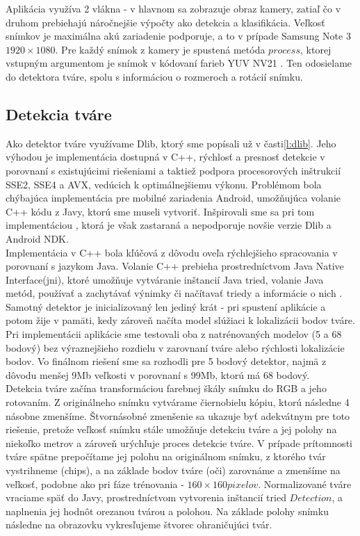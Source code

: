 \indent Aplikácia využíva 2 vlákna - v hlavnom sa zobrazuje obraz kamery, zatiaľ čo v druhom prebiehajú náročnejšie výpočty ako detekcia a klasifikácia.
Veľkosť snímkov je maximálna akú zariadenie podporuje, a to v prípade Samsung Note 3 $ 1920 \times 1080  $.
Pre každý snímok z kamery je spustená metóda $ process $, ktorej vstupným argumentom je snímok v kódovaní farieb YUV NV21 \cite{YUVWikip53}.
Ten odosielame do detektora tváre, spolu s informáciou o rozmeroch a rotácií snímku.

\subsection{Detekcia tváre}
Ako detektor tváre využívame Dlib, ktorý sme popísali už v časti\ref{l:dlib}.
Jeho výhodou je implementácia dostupná v C++, rýchlosť a presnosť detekcie v porovnaní s existujúcimi riešeniami a taktiež podpora procesorových inštrukcií SSE2, SSE4 a AVX, vedúcich k optimálnejšiemu výkonu.
Problémom bola chýbajúca implementácia pre mobilné zariadenia Android, umožňujúca volanie C++ kódu z Javy, ktorú sme museli vytvoriť.
Inšpirovali sme sa pri tom implementáciou \cite{tzutalin82}, ktorá je však zastaraná a nepodporuje novšie verzie Dlib a Android NDK. \\

\indent Implementácia v C++ bola kľúčová z dôvodu oveľa rýchlejšieho spracovania v porovnaní s jazykom Java.
Volanie C++ prebieha prostredníctvom Java Native Interface(\acrshort{jni}), ktoré umožňuje vytváranie inštancií Java tried, volanie Java metód, používať a zachytávať výnimky či načítavať triedy a informácie o nich \cite{Introduc22}. \\

\indent Samotný detektor je inicializovaný len jediný krát - pri spustení aplikácie a potom žije v pamäti, kedy zároveň načíta model slúžiaci k lokalizácii bodov tváre.
Pri implementácii aplikácie sme testovali oba z natrénovaných modelov (5 a 68 bodový) bez výraznejšieho rozdielu v zarovnaní tváre alebo rýchlosti lokalizácie bodov.
Vo finálnom riešení sme sa rozhodli pre 5 bodový detektor, najmä z dôvodu menšej 9Mb veľkosti v porovnaní s 99Mb, ktorú má 68 bodový. \\

\indent Detekcia tváre začína transformáciou farebnej škály snímku do RGB a jeho rotovaním.
Z originálneho snímku vytvárame čiernobielu kópiu, ktorú následne 4 násobne zmenšíme.
Štvornásobné zmenšenie sa ukazuje byť adekvátnym pre toto riešenie, pretože veľkosť snímku stále umožňuje detekciu tváre a jej polohy na niekoľko metrov a zároveň urýchľuje proces detekcie tváre.
V prípade prítomnosti tváre spätne prepočítame jej polohu na originálnom snímku, 
z ktorého tvár vystrihneme (chips), a na základe bodov tváre (oči) zarovnáme a zmenšíme na veľkosť, podobne ako pri fáze trénovania - $ 160 \times 160 pixelov $.
Normalizované tváre vraciame späť do Javy, prostredníctvom vytvorenia inštancií tried $ Detection $, a naplnenia jej hodnôt orezanou tvárou a polohou.
Na základe polohy snímku následne na obrazovku vykresľujeme štvorec ohraničujúci tvár. \\

